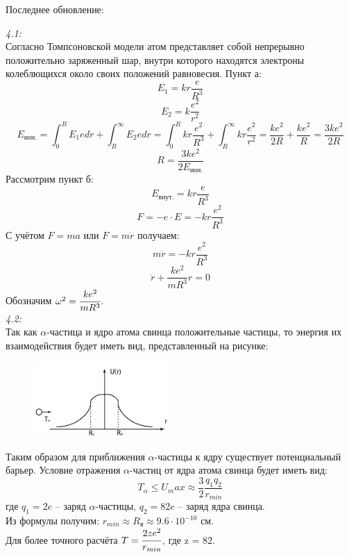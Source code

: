 




	
	Последнее обновление: %

	\emph{4.1:}\\

	Согласно Томпсоновской модели атом представляет собой непрерывно положительно 
	заряженный шар, внутри которого находятся электроны колеблющихся около своих
	положений равновесия.
	Пункт а: \\
		\[ E_1 = kr\frac{e}{R^3} \]
		\[ E_2 = k\frac{e^2}{r^2} \]
		\[ 
			E_\text{ион.} = \int^R_0 E_1 e dr + \int^\infty_R E_2 e dr = 
			\int^R_0 kr\frac{e^2}{R^3} + \int^\infty_R kr\frac{e^2}{r^2} =
			\frac{ke^2}{2R} + \frac{ke^2}{R} = \frac{3ke^2}{2R}
		\]
		\[
			R = \frac{3ke^2}{2E_\text{ион.}}
		\]
	Рассмотрим пункт б: \\
		\[ E_{внут.} = kr\frac{e}{R^3} \]
		\[ F = -e\cdot E = -kr\frac{e^2}{R^3} \]
	С учётом \( F = ma \) или \( F = m\ddot{r} \) получаем:
		\[ m\ddot{r} = -kr\frac{e^2}{R^3} \]
		\[ \ddot{r} + \frac{ke^2}{mR^3}r = 0 \]
	Обозначим \( \omega^2 = \cfrac{ke^2}{mR^3} \). \\

	\emph{4.2:}\\

	Так как \( \alpha \)-частица и ядро атома свинца положительные частицы, то
	энергия их взаимодействия будет иметь вид, представленный на рисунке:

	\begin{figure}[b!]
	    \center
	    \includegraphics[width=0.47\textwidth]{4_2.pdf}
	\end{figure}

	Таким образом для приближения \( \alpha \)-частицы к ядру существует потенциальный
	барьер. Условие отражения \( \alpha \)-частиц от ядра атома свинца будет иметь вид:
		\[ T_\alpha \leq U_max \approx \frac{3}{2}\frac{q_1 q_2}{r_{min}} \]
	где \( q_1 = 2e \) -- заряд \( \alpha \)-частицы, \( q_2 = 82e \) -- заряд ядра свинца. \\
	Из формулы получим: \( r_{min} \approx R_\text{я} \approx 9.6\cdot10^{-10} \) см. \\
	Для более точного расчёта \( T = \cfrac{2ze^2}{r_{min}} \), где z = 82.\\

